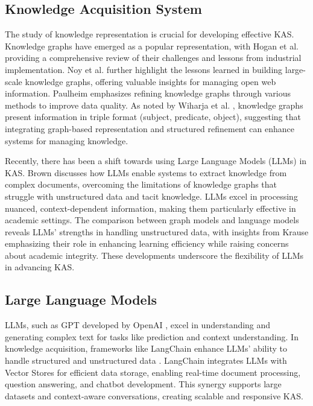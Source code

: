 \documentclass[runningheads]{llncs}
\begin{document}
\subsection{Knowledge Acquisition System}
The study of knowledge representation is crucial for developing effective KAS. Knowledge graphs have emerged as a popular representation, with Hogan et al. \cite{Hogan2021} providing a comprehensive review of their challenges and lessons from industrial implementation. Noy et al. \cite{Noy2019} further highlight the lessons learned in building large-scale knowledge graphs, offering valuable insights for managing open web information. Paulheim \cite{Paulheim2017} emphasizes refining knowledge graphs through various methods to improve data quality. As noted by Wiharja et al. \cite{wiharja2020iterative}, knowledge graphs present information in triple format (subject, predicate, object), suggesting that integrating graph-based representation and structured refinement can enhance systems for managing knowledge.

Recently, there has been a shift towards using Large Language Models (LLMs) in KAS. Brown \cite{Brown2020} discusses how LLMs enable systems to extract knowledge from complex documents, overcoming the limitations of knowledge graphs that struggle with unstructured data and tacit knowledge. LLMs excel in processing nuanced, context-dependent information, making them particularly effective in academic settings. The comparison between graph models and language models reveals LLMs' strengths in handling unstructured data, with insights from Krause \cite{Krause2024} emphasizing their role in enhancing learning efficiency while raising concerns about academic integrity. These developments underscore the flexibility of LLMs in advancing KAS.

\subsection{Large Language Models}
LLMs, such as GPT developed by OpenAI \cite{Brown2020}, excel in understanding and generating complex text for tasks like prediction and context understanding. In knowledge acquisition, frameworks like LangChain enhance LLMs' ability to handle structured and unstructured data \cite{deepLearning2023LangChain}. LangChain integrates LLMs with Vector Stores for efficient data storage, enabling real-time document processing, question answering, and chatbot development. This synergy supports large datasets and context-aware conversations, creating scalable and responsive KAS.
\end{document}
